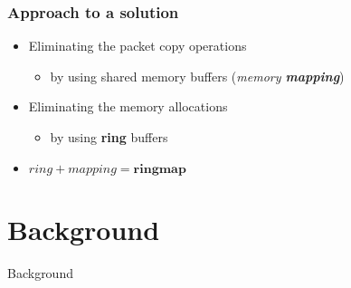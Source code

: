 \documentclass{beamer}
\begin{document}
\begin{frame}
\frametitle{Approach to a solution}
\begin{itemize}
	\item<1-> Eliminating the packet copy operations
		\begin{itemize}
			\item<1-> by using shared memory buffers (\emph{memory \textbf{mapping}})\newline
		\end{itemize}
	\item<2-> Eliminating the memory allocations
		\begin{itemize}
			\item<2-> by using \textbf{ring} buffers\newline \newline
		\end{itemize}
	\item<3->[$\Rightarrow$] $ring + mapping = \textbf{ringmap}$
\end{itemize}
\end{frame}

\section{Background}
\begin{frame}
	\begin{center}
	\huge{Background}
	\end{center}
\end{frame}
\end{document}
